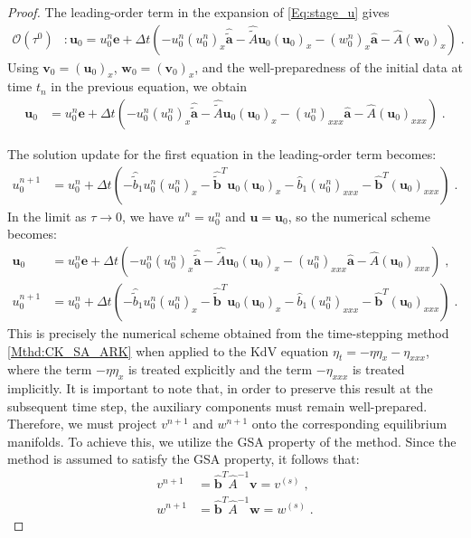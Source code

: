 \documentclass[10pt,a4paper]{amsart}
\newcommand{\tIIAex}{\hat{\tilde{A}}}
\newcommand{\tIIAim}{\hat{A}}
\newcommand{\tIIaex}{\pmb{\hat{\tilde{a}}}}
\newcommand{\tIIaim}{\pmb{\hat{a}}}
\newcommand{\tIIbexf}{\hat{\tilde{b}}_1}
\newcommand{\tIIbex}{\pmb{\hat{\tilde{b}}}}
\newcommand{\tIIbimf}{\hat{b}_1}
\newcommand{\tIIbim}{\pmb{\hat{b}}}
\newcommand{\ukdv}{\eta}
\begin{document}
\begin{proof}
The leading-order term in the expansion of \eqref{Eq:stage_u} gives
\begin{align*}
    \mathcal{O}\left(\tau^{0}\right) & \colon \pmb{u}_0 = u_0^n \pmb{e} + \Delta t \left( - u_0^n (u_{0}^n)_x \tIIaex - \tIIAex \pmb{u}_0 (\pmb{u}_0)_x -(w_0^n)_x \tIIaim - \tIIAim(\pmb{w}_0)_x \right)\;.
\end{align*}
Using $\pmb{v}_0 =  (\pmb{u}_0)_x$, $\pmb{w}_0 =  (\pmb{v}_0)_x$, and the well-preparedness of the initial data at time $t_n$
in the previous equation, we obtain
\begin{align}\label{Eq:Asymp_stage_u}
    \pmb{u}_0 & = u_0^n \pmb{e} + \Delta t \left(  - u_0^n (u_{0}^n)_x \tIIaex - \tIIAex \pmb{u}_0 (\pmb{u}_0)_x -(u_0^n)_{xxx} \tIIaim - \tIIAim(\pmb{u}_0)_{xxx}  \right)\;.
\end{align}

The solution update for the first equation in the leading-order term becomes:
\begin{align}\label{Eq:Asymp_sol_u}
    u_0^{n+1} &= u_0^n  + \Delta t \left(  - \tIIbexf u_0^n (u_{0}^n)_x  - \tIIbex^T  \pmb{u}_0 (\pmb{u}_0)_x -\tIIbimf(u_0^n)_{xxx}  - \tIIbim^T  (\pmb{u}_0)_{xxx} \right) \;.
\end{align}
In the limit as $\tau \to 0$, we have $u^n = u^n_0$ and $\pmb{u} = \pmb{u}_0$, so the numerical scheme becomes:
\begin{subequations}
    \begin{align*}
        \pmb{u}_0 & = u_0^n \pmb{e} + \Delta t \left(  - u_0^n (u_{0}^n)_x \tIIaex - \tIIAex \pmb{u}_0 (\pmb{u}_0)_x -(u_0^n)_{xxx} \tIIaim - \tIIAim(\pmb{u}_0)_{xxx}  \right)\;, \\
        u_0^{n+1} &= u_0^n  + \Delta t \left(  - \tIIbexf u_0^n (u_{0}^n)_x  - \tIIbex^T  \pmb{u}_0 (\pmb{u}_0)_x -\tIIbimf(u_0^n)_{xxx}  - \tIIbim^T  (\pmb{u}_0)_{xxx} \right)\;.
    \end{align*}
\end{subequations}
This is precisely the numerical scheme obtained from the time-stepping method \eqref{Mthd:CK_SA_ARK} when applied to the KdV
equation $\ukdv_t = - \ukdv \ukdv_x -\ukdv_{xxx} $, where the term $-\ukdv \ukdv_x$ is treated explicitly and the term $-\ukdv_{xxx}$ is treated implicitly.
It is important to note that, in order to preserve this result at the subsequent time step, the auxiliary components must
remain well-prepared. Therefore, we must project $v^{n+1}$ and $w^{n+1}$ onto the corresponding equilibrium manifolds. To achieve
this, we utilize the GSA property of the method. Since the method is assumed to satisfy the GSA property, it follows that:
\begin{subequations}
\begin{align*}
    v^{n+1} &= \tIIbim^T\tIIAim^{-1}\pmb{v} = v^{(s)} \;, \\
    w^{n+1} &= \tIIbim^T\tIIAim^{-1}\pmb{w} = w^{(s)} \;.
\end{align*}
\end{subequations}


\end{proof}
\end{document}
